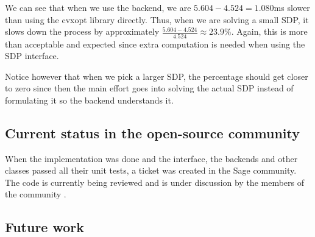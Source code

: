We can see that when we use the backend, we are $5.604 - 4.524 = 1.080$ms slower than using the cvxopt library directly. Thus, when we are solving a small SDP, it slows down the process by approximately 
$\frac{5.604 - 4.524}{4.524} \approx 23.9\%$. Again, this is more than acceptable and expected since extra computation is needed when using the SDP interface. 

Notice however that when we pick a larger SDP, the percentage should get closer to zero since then the main effort goes into solving the actual SDP instead of formulating it so the backend understands it.


	\subsection{Current status in the open-source community}
When the implementation was done and the interface, the backends and other classes passed all their unit tests, a ticket was created in the Sage community. The code is currently being reviewed and is under discussion by the members of the community \cite{ticketsdp}.
	

	\subsection{Future work}
	
	
